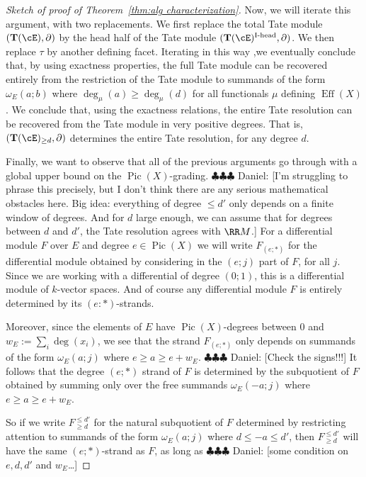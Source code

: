 \documentclass[12pt]{amsart}
\theoremstyle{definition}
\theoremstyle{remark}
\newcommand{\Tate}{{\mathbf{T}}}
\newcommand{\Eff}{\operatorname{Eff}}
\newcommand{\Pic}{\operatorname{Pic}}
\newcommand{\daniel}[1]{{\color{blue} \sf $\clubsuit\clubsuit\clubsuit$ Daniel: [#1]}}
\begin{document}
\begin{proof}[Sketch of proof of Theorem~\ref{thm:alg characterization}]
Now, we will iterate this argument, with two replacements.  We first replace the total Tate module $(\Tate(\cE),\partial)$ by the head half of the Tate module $(\Tate(\cE)^{\text{I-head}},\partial)$.  We then replace $\tau$ by another defining facet.  Iterating in this way ,we eventually conclude that, by using exactness properties, the full Tate module can be recovered entirely from the restriction of the Tate module to summands of the form $\omega_E(a;b)$ where $\deg_{\mu}(a)\geq \deg_{\mu}(d)$ for all functionals $\mu$ defining $\Eff(X)$.  We conclude that, using the exactness relations, the entire Tate resolution can be recovered from the Tate module in very positive degrees.  That is, $(\Tate(\cE)_{\geq d}, \partial)$ determines the entire Tate resolution, for any degree $d$.

Finally, we want to observe that all of the previous arguments go through with a global upper bound on the $\Pic(X)$-grading.  \daniel{I'm struggling to phrase this precisely, but I don't think there are any serious mathematical obstacles here.  Big idea:  everything of degree $\leq d'$ only depends on a finite window of degrees.  And for $d$ large enough, we can assume that for degrees between $d$ and $d'$, the Tate resolution agrees with $\RR M$.}  For a differential module $F$ over $E$ and degree $e \in \Pic(X)$ we will write $F_{(e;*)}$ for the differential module obtained by considering in the $(e;j)$ part of $F$, for all $j$.  Since we are working with a differential of degree $(0;1)$, this is a differential module of $k$-vector spaces.  And of course any differential module $F$ is entirely determined by its $(e:*)$-strands.

Moreover, since the elements of $E$ have $\Pic(X)$-degrees between $0$ and $w_E:= \sum_i \deg(x_i)$, we see that the strand $F_{(e;*)}$ only depends on summands of the form $\omega_E(a;j)$ where $e\geq a \geq e+w_E$. \daniel{Check the signs!!!} It follows that the degree $(e;*)$ strand of $F$ is determined by the subquotient of $F$ obtained by summing only over the free summands $\omega_E(-a;j)$ where $e\geq a \geq e+w_E$.

So if we write $F^{\leq d'}_{\geq d}$ for the natural subquotient of $F$ determined by restricting attention to summands of the form $\omega_E(a;j)$ where $d \leq -a \leq d'$, then $F^{\leq d'}_{\geq d}$ will have the same $(e;*)$-strand as $F$, as long as \daniel{some condition on $e,d,d'$ and $w_E$\dots}


\end{proof}
\end{document}
